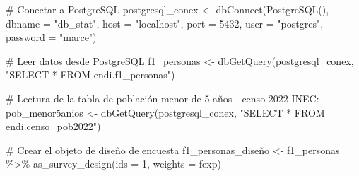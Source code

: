 \documentclass[
  letterpaper,
  DIV=11,
  numbers=noendperiod]{scrreprt}
\newenvironment{Shaded}{\begin{snugshade}}{\end{snugshade}}
\newcommand{\AttributeTok}[1]{\textcolor[rgb]{0.40,0.45,0.13}{#1}}
\newcommand{\CommentTok}[1]{\textcolor[rgb]{0.37,0.37,0.37}{#1}}
\newcommand{\DecValTok}[1]{\textcolor[rgb]{0.68,0.00,0.00}{#1}}
\newcommand{\FunctionTok}[1]{\textcolor[rgb]{0.28,0.35,0.67}{#1}}
\newcommand{\NormalTok}[1]{\textcolor[rgb]{0.00,0.23,0.31}{#1}}
\newcommand{\OtherTok}[1]{\textcolor[rgb]{0.00,0.23,0.31}{#1}}
\newcommand{\SpecialCharTok}[1]{\textcolor[rgb]{0.37,0.37,0.37}{#1}}
\newcommand{\StringTok}[1]{\textcolor[rgb]{0.13,0.47,0.30}{#1}}
\begin{document}
\begin{Shaded}
\begin{Highlighting}[]
\CommentTok{\# Conectar a PostgreSQL}
\NormalTok{postgresql\_conex }\OtherTok{\textless{}{-}} \FunctionTok{dbConnect}\NormalTok{(}\FunctionTok{PostgreSQL}\NormalTok{(),}
                 \AttributeTok{dbname =} \StringTok{"db\_stat"}\NormalTok{,}
                 \AttributeTok{host =} \StringTok{"localhost"}\NormalTok{, }
                 \AttributeTok{port =} \DecValTok{5432}\NormalTok{,}
                 \AttributeTok{user =} \StringTok{"postgres"}\NormalTok{,}
                 \AttributeTok{password =} \StringTok{"marce"}\NormalTok{)}

\CommentTok{\# Leer datos desde PostgreSQL}
\NormalTok{f1\_personas }\OtherTok{\textless{}{-}} \FunctionTok{dbGetQuery}\NormalTok{(postgresql\_conex, }\StringTok{"SELECT * FROM endi.f1\_personas"}\NormalTok{)}

\CommentTok{\# Lectura de la tabla de población menor de 5 años {-} censo 2022 INEC:}
\NormalTok{pob\_menor5anios }\OtherTok{\textless{}{-}} \FunctionTok{dbGetQuery}\NormalTok{(postgresql\_conex, }\StringTok{"SELECT * FROM endi.censo\_pob2022"}\NormalTok{)}

\CommentTok{\# Crear el objeto de diseño de encuesta}
\NormalTok{f1\_personas\_diseño }\OtherTok{\textless{}{-}}\NormalTok{ f1\_personas }\SpecialCharTok{\%\textgreater{}\%}
    \FunctionTok{as\_survey\_design}\NormalTok{(}\AttributeTok{ids =} \DecValTok{1}\NormalTok{, }\AttributeTok{weights =}\NormalTok{ fexp)}


\end{Highlighting}
\end{Shaded}
\end{document}
